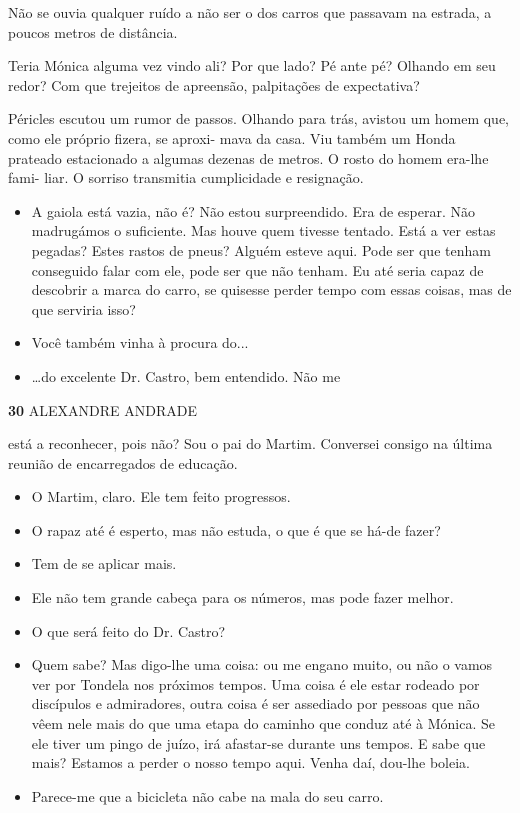 Não se ouvia qualquer ruído a não ser o dos carros que passavam na
estrada, a poucos metros de distância.

Teria Mónica alguma vez vindo ali? Por que lado? Pé ante pé? Olhando em
seu redor? Com que trejeitos de apreensão, palpitações de expectativa?

Péricles escutou um rumor de passos. Olhando para trás, avistou um homem
que, como ele próprio fizera, se aproxi- mava da casa. Viu também um
Honda prateado estacionado a algumas dezenas de metros. O rosto do homem
era-lhe fami- liar. O sorriso transmitia cumplicidade e resignação.

\begin{itemize}
\tightlist
\item
  A gaiola está vazia, não é? Não estou surpreendido. Era de esperar.
  Não madrugámos o suficiente. Mas houve quem tivesse tentado. Está a
  ver estas pegadas? Estes rastos de pneus? Alguém esteve aqui. Pode ser
  que tenham conseguido falar com ele, pode ser que não tenham. Eu até
  seria capaz de descobrir a marca do carro, se quisesse perder tempo
  com essas coisas, mas de que serviria isso?
\item
  Você também vinha à procura do...
\item
  \ldots{}do excelente Dr. Castro, bem entendido. Não me
\end{itemize}

\textbf{30 }ALEXANDRE ANDRADE

está a reconhecer, pois não? Sou o pai do Martim. Conversei consigo na
última reunião de encarregados de educação.

\begin{itemize}
\tightlist
\item
  O Martim, claro. Ele tem feito progressos.
\item
  O rapaz até é esperto, mas não estuda, o que é que se há-de fazer?
\item
  Tem de se aplicar mais.
\item
  Ele não tem grande cabeça para os números, mas pode fazer melhor.
\item
  O que será feito do Dr. Castro?
\item
  Quem sabe? Mas digo-lhe uma coisa: ou me engano muito, ou não o vamos
  ver por Tondela nos próximos tempos. Uma coisa é ele estar rodeado por
  discípulos e admiradores, outra coisa é ser assediado por pessoas que
  não vêem nele mais do que uma etapa do caminho que conduz até à
  Mónica. Se ele tiver um pingo de juízo, irá afastar-se durante uns
  tempos. E sabe que mais? Estamos a perder o nosso tempo aqui. Venha
  daí, dou-lhe boleia.
\item
  Parece-me que a bicicleta não cabe na mala do seu carro.
\end{itemize}

